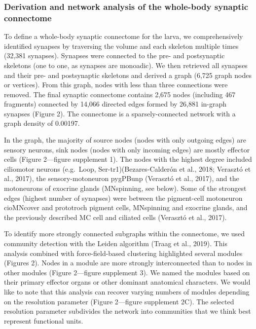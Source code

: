 \documentclass[
  11pt,
]{article}
\begin{document}
\subsubsection{Derivation and network analysis of the whole-body
synaptic
connectome}\label{derivation-and-network-analysis-of-the-whole-body-synaptic-connectome}

To define a whole-body synaptic connectome for the larva, we
comprehensively identified synapses by traversing the volume and each
skeleton multiple times (32,381 synapses). Synapses were connected to
the pre- and postsynaptic skeletons (one to one, as synapses are
monoadic). We then retrieved all synapses and their pre- and
postsynaptic skeletons and derived a graph (6,725 graph nodes or
vertices). From this graph, nodes with less than three connections were
removed. The final synaptic connectome contains 2,675 nodes (including
467 fragments) connected by 14,066 directed edges formed by 26,881
in-graph synapses (Figure 2). The connectome is a sparsely-connected
network with a graph density of 0.00197.

In the graph, the majority of source nodes (nodes with only outgoing
edges) are sensory neurons, sink nodes (nodes with only incoming edges)
are mostly effector cells (Figure 2---figure supplement 1). The nodes
with the highest degree included ciliomotor neurons (e.g.~Loop,
Ser-tr1)(Bezares-Calderón et al., 2018; Verasztó et al., 2017), the
sensory-motoneuron pygPBunp (Verasztó et al., 2017), and the motoneurons
of exocrine glands (MNspinning, see below). Some of the strongest edges
(highest number of synapses) were between the pigment-cell motoneuron
cioMNcover and prototroch pigment cells, MNspinning and exocrine glands,
and the previously described MC cell and ciliated cells (Verasztó et
al., 2017).

To identify more strongly connected subgraphs within the connectome, we
used community detection with the Leiden algorithm (Traag et al., 2019).
This analysis combined with force-field-based clustering highlighted
several modules (Figures 2). Nodes in a module are more strongly
interconnected than to nodes in other modules (Figure 2---figure
supplement 3). We named the modules based on their primary effector
organs or other dominant anatomical characters. We would like to note
that this analysis can recover varying numbers of modules depending on
the resolution parameter (Figure 2---figure supplement 2C). The selected
resolution parameter subdivides the network into communities that we
think best represent functional units.
\end{document}
